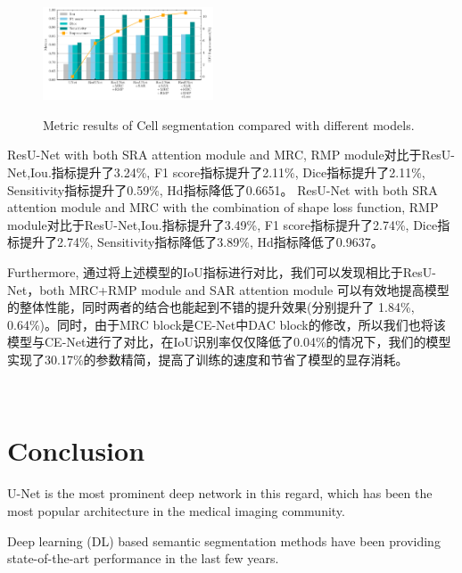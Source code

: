 \documentclass{ieeeaccess}
\begin{document}
     
   
      
    \begin{figure}[htbp]
      \begin{center}
      \includegraphics[width=0.45\textwidth]{figure/cell_comparison.pdf}
      \vspace{-2mm}
      \caption{Metric results of Cell segmentation compared with different models.} 
      \vspace{-2mm}
      \label{fig:cell_comparison}
      \end{center}
      \vspace{-0.35cm}
    \end{figure}
    ResU-Net with both SRA attention module and MRC, RMP module对比于ResU-Net,Iou.指标提升了3.24\%, F1 score指标提升了2.11\%, Dice指标提升了2.11\%, Sensitivity指标提升了0.59\%, Hd指标降低了0.6651。
    ResU-Net with both SRA attention module and MRC with the combination of shape loss function, 
    RMP module对比于ResU-Net,Iou.指标提升了3.49\%, F1 score指标提升了2.74\%, Dice指标提升了2.74\%, Sensitivity指标降低了3.89\%, Hd指标降低了0.9637。
    
  Furthermore, 通过将上述模型的IoU指标进行对比，我们可以发现相比于ResU-Net，both MRC+RMP module and SAR attention module 可以有效地提高模型的整体性能，同时两者的结合也能起到不错的提升效果(分别提升了
    1.84\%, 0.64\%)。同时，由于MRC block是CE-Net中DAC block的修改，所以我们也将该模型与CE-Net进行了对比，在IoU识别率仅仅降低了0.04\%的情况下，我们的模型实现了30.17\%的参数精简，提高了训练的速度和节省了模型的显存消耗。
  
  ~\\
  
  \section{Conclusion}\label{sec:conc}
  U-Net is the most prominent deep network in this regard,
  which has been the most popular architecture in the medical imaging community.
  
  Deep learning (DL) based semantic segmentation methods have been providing state-of-the-art performance in the last few years.
  
\end{document}
